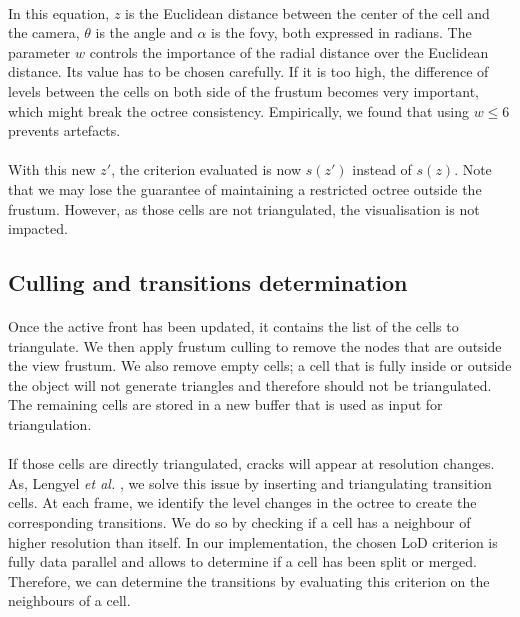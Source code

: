 \paragraph{}
In this equation, $z$ is the Euclidean distance between the center of the cell and the camera, $\theta$ is the angle and $\alpha$ is the fovy, both expressed in radians.
The parameter $w$ controls the importance of the radial distance over the Euclidean distance.
Its value has to be chosen carefully.
If it is too high, the difference of levels between the cells on both side of the frustum becomes very important, which might break the octree consistency. 
Empirically, we found that using $w \leq 6 $ prevents artefacts.

\paragraph{}
With this new $z'$, the criterion evaluated is now $s(z')$ instead of $s(z)$.
Note that we may lose the guarantee of maintaining a restricted octree outside the frustum.
However, as those cells are not triangulated, the visualisation is not impacted.

\subsection{Culling and transitions determination}

\paragraph{}
Once the active front has been updated, it contains the list of the cells to triangulate.
We then apply frustum culling to remove the nodes that are outside the view frustum.
We also remove empty cells; a cell that is fully inside or outside the object will not generate triangles and therefore should not be triangulated.
The remaining cells are stored in a new buffer that is used as input for triangulation.

\paragraph{}
If those cells are directly triangulated, cracks will appear at resolution changes.
As, Lengyel \textit{et al.} \cite{lengyel2010voxel}, we solve this issue by inserting and triangulating transition cells.
At each frame, we identify the level changes in the octree to create the corresponding transitions.
We do so by checking if a cell has a neighbour of higher resolution than itself.
In our implementation, the chosen LoD criterion is fully data parallel and allows to determine if a cell has been split or merged.
Therefore, we can determine the transitions by evaluating this criterion on the neighbours of a cell.

